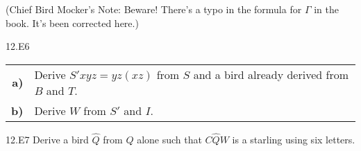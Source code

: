 \documentclass[12pt, letterpaper]{article}
\begin{document}
\vspace{6pt}
\noindent (Chief Bird Mocker's Note: Beware! There's a typo in the formula for $\Gamma$ in the book. It's been corrected here.)

\begin{prob}{12.E6} 
\end{prob}
\begin{tabular}{r p{4.5in}}
\textbf{a)} & Derive $S'xyz = yz(xz)$ from $S$ and a bird already derived from $B$ and $T$. \\
\textbf{b)} & Derive $W$ from $S'$ and $I$.
\end{tabular}

\begin{prob}{12.E7}  
Derive a bird $\hat{Q}$ from $Q$ alone such that $C\hat{Q}W$ is a starling using six letters.
\end{prob}
\end{document}
